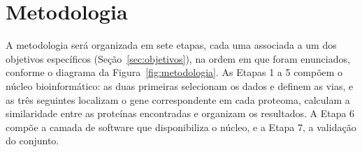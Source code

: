 \chapter{Metodologia}
\label{cap:03}

\usetikzlibrary{arrows.meta,positioning}

A metodologia será organizada em sete etapas, cada uma associada a um dos objetivos específicos (Seção~\ref{sec:objetivos}), na ordem em que foram enunciados, conforme o diagrama da Figura~\ref{fig:metodologia}. As Etapas 1 a 5 compõem o núcleo bioinformático: as duas primeiras selecionam os dados e definem as vias, e as três seguintes localizam o gene correspondente em cada proteoma, calculam a similaridade entre as proteínas encontradas e organizam os resultados. A Etapa 6 compõe a camada de software que disponibiliza o núcleo, e a Etapa 7, a validação do conjunto.

